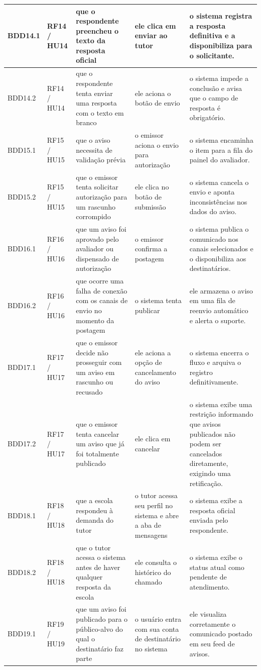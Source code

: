 \documentclass[a4paper,12pt]{report}
\begin{document}
\begin{longtable}{|p{1.6cm}|p{1.6cm}|p{3.6cm}|p{3.6cm}|p{4.0cm}|}
\hline
BDD14.1 & RF14 / HU14 & que o respondente preencheu o texto da resposta oficial & ele clica em enviar ao tutor & o sistema registra a resposta definitiva e a disponibiliza para o solicitante. \\
\hline
BDD14.2 & RF14 / HU14 & que o respondente tenta enviar uma resposta com o texto em branco & ele aciona o botão de envio & o sistema impede a conclusão e avisa que o campo de resposta é obrigatório. \\
\hline
BDD15.1 & RF15 / HU15 & que o aviso necessita de validação prévia & o emissor aciona o envio para autorização & o sistema encaminha o item para a fila do painel do avaliador. \\
\hline
BDD15.2 & RF15 / HU15 & que o emissor tenta solicitar autorização para um rascunho corrompido & ele clica no botão de submissão & o sistema cancela o envio e aponta inconsistências nos dados do aviso. \\
\hline
BDD16.1 & RF16 / HU16 & que um aviso foi aprovado pelo avaliador ou dispensado de autorização & o emissor confirma a postagem & o sistema publica o comunicado nos canais selecionados e o disponibiliza aos destinatários. \\
\hline
BDD16.2 & RF16 / HU16 & que ocorre uma falha de conexão com os canais de envio no momento da postagem & o sistema tenta publicar & ele armazena o aviso em uma fila de reenvio automático e alerta o suporte. \\
\hline
BDD17.1 & RF17 / HU17 & que o emissor decide não prosseguir com um aviso em rascunho ou recusado & ele aciona a opção de cancelamento do aviso & o sistema encerra o fluxo e arquiva o registro definitivamente. \\
\hline
BDD17.2 & RF17 / HU17 & que o emissor tenta cancelar um aviso que já foi totalmente publicado & ele clica em cancelar & o sistema exibe uma restrição informando que avisos publicados não podem ser cancelados diretamente, exigindo uma retificação. \\
\hline
BDD18.1 & RF18 / HU18 & que a escola respondeu à demanda do tutor & o tutor acessa seu perfil no sistema e abre a aba de mensagens & o sistema exibe a resposta oficial enviada pelo respondente. \\
\hline
BDD18.2 & RF18 / HU18 & que o tutor acessa o sistema antes de haver qualquer resposta da escola & ele consulta o histórico do chamado & o sistema exibe o status atual como pendente de atendimento. \\
\hline
BDD19.1 & RF19 / HU19 & que um aviso foi publicado para o público-alvo do qual o destinatário faz parte & o usuário entra com sua conta de destinatário no sistema & ele visualiza corretamente o comunicado postado em seu feed de avisos. \\

\end{longtable}
\end{document}

